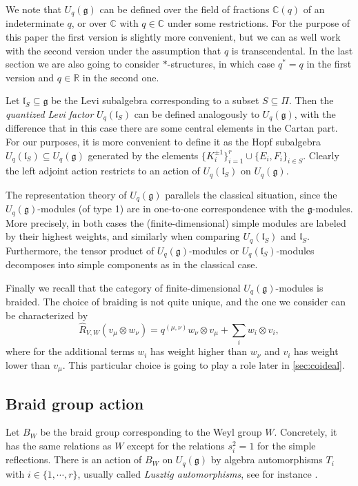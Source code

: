 \documentclass[a4paper, 12pt, reqno, english]{amsart}
\numberwithin{equation}{section}
\numberwithin{figure}{section}
\theoremstyle{plain}
\theoremstyle{plain}
\theoremstyle{plain}
\theoremstyle{plain}
\theoremstyle{plain}
\theoremstyle{definition}
\theoremstyle{definition}
\theoremstyle{definition}
\theoremstyle{remark}
\theoremstyle{definition}
\theoremstyle{definition}
\newcommand{\Uqg}{U_q(\mathfrak{g})}
\newcommand{\UqlS}{U_q(\mathfrak{l}_S)}
\newcommand{\bbC}{\mathbb{C}}
\newcommand{\bbR}{\mathbb{R}}
\newcommand{\lieg}{\mathfrak{g}}
\newcommand{\liel}{\mathfrak{l}}
\newcommand{\simpleroots}{\Pi}
\begin{document}
We note that $\Uqg$ can be defined over the field of fractions $\bbC(q)$ of an indeterminate $q$, or over $\bbC$ with $q \in \bbC$ under some restrictions.
For the purpose of this paper the first version is slightly more convenient, but we can as well work with the second version under the assumption that $q$ is transcendental.
In the last section we are also going to consider $*$-structures, in which case $q^* = q$ in the first version and $q \in \bbR$ in the second one.

Let $\liel_S \subseteq \lieg$ be the Levi subalgebra corresponding to a subset $S \subseteq \simpleroots$.
Then the \emph{quantized Levi factor} $\UqlS$ can be defined analogously to $\Uqg$, with the difference that in this case there are some central elements in the Cartan part.
For our purposes, it is more convenient to define it as the Hopf subalgebra $\UqlS \subseteq \Uqg$  generated by the elements $\{ K_i^{\pm 1} \}_{i = 1}^r \cup \{ E_i, F_i \}_{i \in S}$.
Clearly the left adjoint action restricts to an action of $\UqlS$ on $\Uqg$.

The representation theory of $\Uqg$ parallels the classical situation, since
the $\Uqg$-modules (of type 1) are in one-to-one correspondence with the $\lieg$-modules.
More precisely, in both cases the (finite-dimensional) simple modules are labeled by their highest weights, and similarly when comparing $\UqlS$ and $\liel_S$.
Furthermore, the tensor product of $\Uqg$-modules or $\UqlS$-modules decomposes into simple components as in the classical case.

Finally we recall that the category of finite-dimensional $\Uqg$-modules is braided.
The choice of braiding is not quite unique, and the one we consider can be characterized by
\[
\hat{R}_{V, W}(v_\mu \otimes w_\nu) = q^{(\mu, \nu)} w_\nu \otimes v_\mu + \sum_i w_i \otimes v_i,
\]
where for the additional terms $w_i$ has weight higher than $w_\nu$ and $v_i$ has weight lower than $v_\mu$.
This particular choice is going to play a role later in \cref{sec:coideal}.

\subsection{Braid group action}

Let $B_W$ be the braid group corresponding to the Weyl group $W$.
Concretely, it has the same relations as $W$ except for the relations $s_i^2 = 1$ for the simple reflections.
There is an action of $B_W$ on $\Uqg$ by algebra automorphisms $T_i$ with $i \in \{ 1, \cdots, r \}$, usually called \emph{Lusztig automorphisms}, see for instance \cite[Section I.6.7]{brown-goodearl}.
\end{document}
